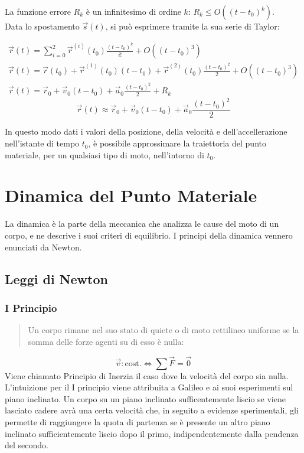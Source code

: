 \documentclass{article}
\numberwithin{equation}{subsection}
\begin{document}
La funzione errore $R_k$ è un infinitesimo di ordine $k$: 
$R_k \leq O((t-t_0)^{k})$.\\

Data lo spostamento $\vec{s}(t)$, si può esprimere tramite la sua 
serie di Taylor: 

\begin{gather*}
    \vec{r}(t)=\sum_{i=0}^{2}\displaystyle\vec{r}^{(i)}(t_0)\frac{(t-t_0)^k}{i!}+O((t-t_0)^{3})\\
    \vec{r}(t)=\vec{r}(t_0) + \vec{r}^{(1)}(t_0)(t-t_0)+\vec{r}^{(2)}(t_0)\displaystyle\frac{(t-t_0)^{2}}{2}+O((t-t_0)^{3})\\
    {\vec{r}}(t)=\vec{r}_0+\vec{v}_0(t-t_0)+\vec{a}_0\displaystyle\frac{(t-t_0)^{2}}{2}+R_k
\end{gather*}
\begin{equation}
    {\vec{r}}(t)\approx\vec{r}_0+\vec{v}_0(t-t_0)+\vec{a}_0\displaystyle\frac{(t-t_0)^{2}}{2}
\end{equation}

In questo modo dati i valori della posizione, della velocità 
e dell'accellerazione nell'istante di tempo $t_0$, è possibile 
approssimare la traiettoria del punto materiale, per un qualsiasi tipo di moto, nell'intorno di $t_0$.

\clearpage

\section{Dinamica del Punto Materiale}
La dinamica è la parte della meccanica che analizza le cause del moto di un corpo, e ne descrive i suoi criteri di equilibrio. I principi della dinamica vennero 
enunciati da Newton. 

\subsection{Leggi di Newton}

\subsubsection{I Principio}
\begin{quotation}
    Un corpo rimane nel suo stato di quiete o di moto rettilineo 
    uniforme se la somma delle forze agenti su di esso è nulla:
\end{quotation}
\begin{equation}
    \vec{v}:\mbox{cost.}\iff \sum\vec{F}=\vec{0}
\end{equation}
Viene chiamato Principio di Inerzia il caso dove la velocità 
del corpo sia nulla.
L'intuizione per il I principio viene attribuita a Galileo 
e ai suoi esperimenti sul piano inclinato. Un corpo su un piano 
inclinato sufficentemente liscio se viene lasciato cadere 
avrà una certa velocità che, in seguito a evidenze sperimentali,
gli permette di raggiungere la quota di partenza 
se è presente un altro piano inclinato sufficientemente liscio dopo il primo, indipendentemente dalla pendenza del secondo. 
\end{document}

